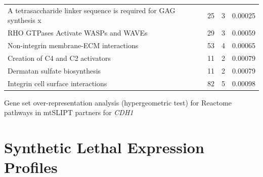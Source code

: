 \begin{table}[!ht]
{\begin{threeparttable}
\begin{tabular}{lccc}
  A tetrasaccharide linker sequence is required for GAG synthesis \textcolor{black!10}{x} &  25 &   3 & 0.00025 \\ 
  \rowcolor{black!5}
  RHO GTPases Activate WASPs and WAVEs &  29 &   3 & 0.00059 \\ 
  \rowcolor{black!10}
  Non-integrin membrane-ECM interactions &  53 &   4 & 0.00065 \\ 
  \rowcolor{black!5}
  Creation of C4 and C2 activators &  11 &   2 & 0.00079 \\ 
  \rowcolor{black!10}
  Dermatan sulfate biosynthesis &  11 &   2 & 0.00079 \\ 
  \rowcolor{black!5}
  Integrin cell surface interactions &  82 &   5 & 0.00098 \\ 
  \hline
\end{tabular}
\begin{tablenotes}
\raggedright \small
Gene set over-representation analysis (hypergeometric test) for Reactome pathways in mtSLIPT partners for \textit{CDH1}
\end{tablenotes}
\end{threeparttable}
}
\end{table}


\FloatBarrier

\section{Synthetic Lethal Expression Profiles} \label{results:stad_mtSL_clusters}


